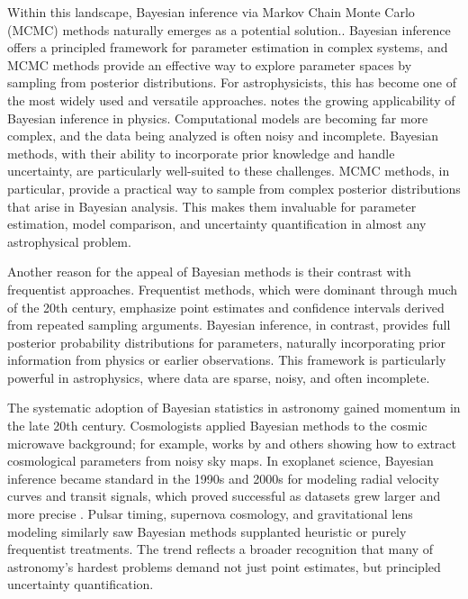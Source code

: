 \documentclass[preprint,longauthor]{aastex631}
\numberwithin{equation}{section}
\begin{document}
Within this landscape, Bayesian inference via Markov Chain Monte Carlo (MCMC) methods naturally emerges as a potential solution.. Bayesian inference offers a principled framework for parameter estimation in complex systems, and MCMC methods provide an effective way to explore parameter spaces by sampling from posterior distributions. For astrophysicists, this has become one of the most widely used and versatile approaches. \citet{vontoussaintBayesianInferencePhysics2011} notes the growing applicability of Bayesian inference in physics. Computational models are becoming far more complex, and the data being analyzed is often noisy and incomplete. Bayesian methods, with their ability to incorporate prior knowledge and handle uncertainty, are particularly well-suited to these challenges. MCMC methods, in particular, provide a practical way to sample from complex posterior distributions that arise in Bayesian analysis. This makes them invaluable for parameter estimation, model comparison, and uncertainty quantification in almost any astrophysical problem.

Another reason for the appeal of Bayesian methods is their contrast with frequentist approaches. Frequentist methods, which were dominant through much of the 20th century, emphasize point estimates and confidence intervals derived from repeated sampling arguments. Bayesian inference, in contrast, provides full posterior probability distributions for parameters, naturally incorporating prior information from physics or earlier observations. This framework is particularly powerful in astrophysics, where data are sparse, noisy, and often incomplete.

The systematic adoption of Bayesian statistics in astronomy gained momentum in the late 20th century. Cosmologists applied Bayesian methods to the cosmic microwave background; for example, works by \citet{tegmarkKarhunenLoeveEigenvalueProblems1997} and others showing how to extract cosmological parameters from noisy sky maps. In exoplanet science, Bayesian inference became standard in the 1990s and 2000s for modeling radial velocity curves and transit signals, which proved successful as datasets grew larger and more precise \citep{gregoryBayesianAnalysisExtrasolar2005}. Pulsar timing, supernova cosmology, and gravitational lens modeling similarly saw Bayesian methods supplanted heuristic or purely frequentist treatments. The trend reflects a broader recognition that many of astronomy’s hardest problems demand not just point estimates, but principled uncertainty quantification.
\end{document}
